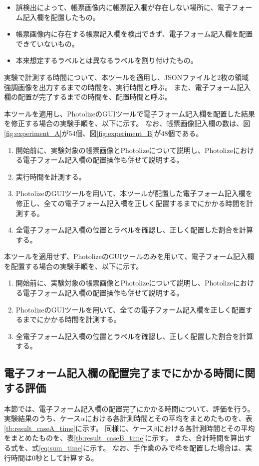 \begin{itemize}
    \item 誤検出によって、帳票画像内に帳票記入欄が存在しない場所に、電子フォーム記入欄を配置したもの。
    \item 帳票画像内に存在する帳票記入欄を検出できず、電子フォーム記入欄を配置できていないもの。
    \item 本来想定するラベルとは異なるラベルを割り付けたもの。
\end{itemize}

実験で計測する時間について、本ツールを適用し、JSONファイルと2枚の領域強調画像を出力するまでの時間を、実行時間と呼ぶ。
また、電子フォーム記入欄の配置が完了するまでの時間を、配置時間と呼ぶ。

本ツールを適用し、PhotolizeのGUIツールで電子フォーム記入欄を配置した結果を修正する場合の実験手順を、以下に示す。
なお、帳票画像記入欄の数は、図\ref{fig:experiment_A}が54個、図\ref{fig:experiment_B}が48個である。

\begin{enumerate}
    \item 開始前に、実験対象の帳票画像とPhotolizeについて説明し、Photolizeにおける電子フォーム記入欄の配置操作も併せて説明する。
    \item 実行時間を計測する。
    \item PhotolizeのGUIツールを用いて、本ツールが配置した電子フォーム記入欄を修正し、全ての電子フォーム記入欄を正しく配置するまでにかかる時間を計測する。
    \item 全電子フォーム記入欄の位置とラベルを確認し、正しく配置した割合を計算する。
\end{enumerate}

本ツールを適用せず、PhotolizeのGUIツールのみを用いて、電子フォーム記入欄を配置する場合の実験手順を、以下に示す。

\begin{enumerate}
    \item 開始前に、実験対象の帳票画像とPhotolizeについて説明し、Photolizeにおける電子フォーム記入欄の配置操作も併せて説明する。
    \item PhotolizeのGUIツールを用いて、全ての電子フォーム記入欄を正しく配置するまでにかかる時間を計測する。
    \item 全電子フォーム記入欄の位置とラベルを確認し、正しく配置した割合を計算する。
\end{enumerate}

\subsection{電子フォーム記入欄の配置完了までにかかる時間に関する評価}\label{subsec:evalue_required_time}
本節では、電子フォーム記入欄の配置完了にかかる時間について、評価を行う。
実験結果のうち、ケース$\alpha$における各計測時間とその平均をまとめたものを、表\ref{tb:result_caseA_time}に示す。
同様に、ケース$\beta$における各計測時間とその平均をまとめたものを、表\ref{tb:result_caseB_time}に示す。
また、合計時間を算出する式を、式\ref{eq:sum_time}に示す。
なお、手作業のみで枠を配置した場合は、実行時間は0秒として計算する。

